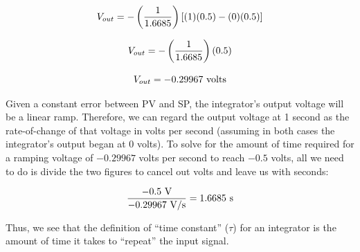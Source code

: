 $$V_{out} = - \left({1 \over 1.6685}\right) [(1)(0.5) - (0)(0.5)]$$

$$V_{out} = - \left({1 \over 1.6685}\right) (0.5)$$

$$V_{out} = - 0.29967 \hbox{ volts}$$

Given a constant error between PV and SP, the integrator's output voltage will be a linear ramp.  Therefore, we can regard the output voltage at 1 second as the rate-of-change of that voltage in volts per second (assuming in both cases the integrator's output began at 0 volts).  To solve for the amount of time required for a ramping voltage of $-0.29967$ volts per second to reach $-0.5$ volts, all we need to do is divide the two figures to cancel out volts and leave us with seconds:

$${-0.5 \hbox{ V} \over -0.29967 \hbox{ V/s}} = 1.6685 \hbox{ s}$$

Thus, we see that the definition of ``time constant'' ($\tau$) for an integrator is the amount of time it takes to ``repeat'' the input signal.




